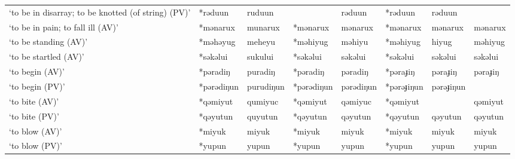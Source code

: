 \begin{landscape}
\begin{longtable}[c]{@{}p{3cm}<{\raggedright}p{2.75cm}<{\raggedright}p{2.75cm}<{\raggedright}p{2.75cm}<{\raggedright}p{2.75cm}<{\raggedright}p{2.75cm}<{\raggedright}p{2.75cm}<{\raggedright}p{2.75cm}<{\raggedright}@{}}
`to be in disarray; to be knotted (of string) (PV)'  & *rəduun            & ruduun                         &                    & rəduun                     & *rəduun          & rəduun                   &                                   \\
`to be in pain; to fall ill (AV)'                    & *mənarux           & munarux                        & *mənarux           & mənarux                    & *mənarux         & mənarux                  & mənarux                           \\
`to be standing (AV)'                                & *məhəyug           & meheyu                         & *məhiyug           & məhiyu                     & *məhiyug         & hiyug                    & məhiyug                           \\
`to be startled (AV)'                                & *səkəlui           & sukului                        & *səkəlui           & səkəlui                    & *səkəlui         & səkəlui                  & səkəlui                           \\
`to begin (AV)'                                      & *pəradiŋ           & puradiŋ                        & *pəradiŋ           & pəradiŋ                    & *pəraɟiŋ         & pəraɟiŋ                  & pəraɟiŋ                           \\
`to begin (PV)'                                      & *pərədiŋun         & purudiŋun                      & *pərədiŋun         & pərədiŋun                  & *pərəɟiŋun       & pərəɟiŋun                &                                   \\
`to bite (AV)'                                       & *qəmiyut           & qumiyuc                        & *qəmiyut           & qəmiyuc                    & *qəmiyut         &                          & qəmiyut                           \\
`to bite (PV)'                                       & *qəyutun           & quyutun                        & *qəyutun           & qəyutun                    & *qəyutun         & qəyutun                  & qəyutun                           \\
`to blow (AV)'                                       & *miyuk             & miyuk                          & *miyuk             & miyuk                      & *miyuk           & miyuk                    & miyuk                             \\
`to blow (PV)'                                       & *yupun             & yupun                          & *yupun             & yupun                      & *yupun           & yupun                    & yupun                             \\

\end{longtable}
\end{landscape}

